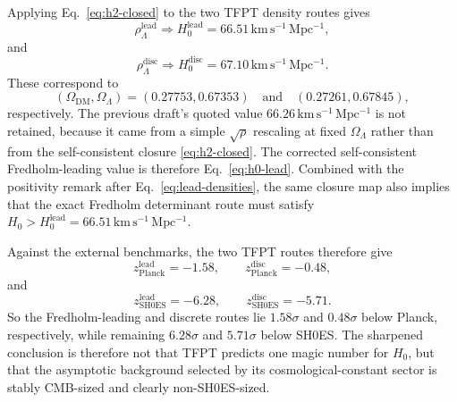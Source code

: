 \documentclass[aps,prl,reprint,superscriptaddress,longbibliography,nofootinbib,floatfix]{revtex4-2}
\newcommand{\rhoLambda}{\rho_{\Lambda}}
\begin{document}
Applying Eq.~\eqref{eq:h2-closed} to the two TFPT density routes gives
\begin{equation}
\rhoLambda^{\mathrm{lead}}
\Rightarrow
H_0^{\mathrm{lead}}
=
66.51\,\mathrm{km\,s^{-1}\,Mpc^{-1}},
\label{eq:h0-lead}
\end{equation}
and
\begin{equation}
\rhoLambda^{\mathrm{disc}}
\Rightarrow
H_0^{\mathrm{disc}}
=
67.10\,\mathrm{km\,s^{-1}\,Mpc^{-1}}.
\label{eq:h0-disc}
\end{equation}
These correspond to
\[
(\Omega_{\mathrm{DM}},\Omega_{\Lambda})
=(0.27753,0.67353)
\quad\text{and}\quad
(0.27261,0.67845),
\]
respectively. The previous draft's quoted value $66.26\,\mathrm{km\,s^{-1}\,Mpc^{-1}}$ is not retained, because it came from a simple $\sqrt{\rho}$ rescaling at fixed $\Omega_{\Lambda}$ rather than from the self-consistent closure \eqref{eq:h2-closed}. The corrected self-consistent Fredholm-leading value is therefore Eq.~\eqref{eq:h0-lead}.
Combined with the positivity remark after Eq.~\eqref{eq:lead-densities}, the same closure map also implies that the exact Fredholm determinant route must satisfy $H_0>H_0^{\mathrm{lead}}=66.51\,\mathrm{km\,s^{-1}\,Mpc^{-1}}$.

Against the external benchmarks, the two TFPT routes therefore give
\[
z_{\mathrm{Planck}}^{\mathrm{lead}}=-1.58,
\qquad
z_{\mathrm{Planck}}^{\mathrm{disc}}=-0.48,
\]
and
\[
z_{\mathrm{SH0ES}}^{\mathrm{lead}}=-6.28,
\qquad
z_{\mathrm{SH0ES}}^{\mathrm{disc}}=-5.71.
\]
So the Fredholm-leading and discrete routes lie $1.58\sigma$ and $0.48\sigma$ below Planck, respectively, while remaining $6.28\sigma$ and $5.71\sigma$ below SH0ES. The sharpened conclusion is therefore not that TFPT predicts one magic number for $H_0$, but that the asymptotic background selected by its cosmological-constant sector is stably CMB-sized and clearly non-SH0ES-sized.
\end{document}
